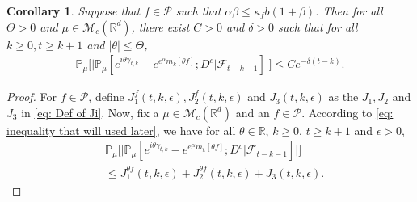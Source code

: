 \documentclass[12pt,a4paper]{amsart}
\theoremstyle{plain}
\newtheorem{cor}[thm]{Corollary}
\theoremstyle{definition}
\numberwithin{equation}{section}
\begin{document}
\begin{cor}\label{cor: used in next corollary}
Suppose that $f\in \mathcal{P}$ such that $\alpha\beta\leq \kappa_fb(1+\beta)$.
Then for all $\Theta >0$ and $\mu\in \mathcal M_c(\mathbb R^d)$,
there exist $C>0$ and $\delta>0$ such that for all $k \geq 0, t\geq k+1$ and $|\theta|\leq \Theta$,
\begin{equation}\begin{split}
    \mathbb{P}_{\mu}\Big[\big|\mathbb{P}_{\mu}[e^{i\theta\gamma_{t,k}}-e^{e^{\alpha}m_k[\theta f]}; D^c | \mathscr F_{t-k-1}]\big|\Big]\leq Ce^{-\delta(t-k)}.
\end{split}\end{equation}
\end{cor}
\begin{proof}
	For  $f\in \mathcal P$, define $J_1^f(t,k,\epsilon), J_2^f(t,k,\epsilon)$ and $J_3(t,k,\epsilon)$ as the $J_1, J_2$ and $J_3$ in \eqref{eq: Def of Ji}.
	Now, fix a $\mu \in \mathcal M_c(\mathbb R^d)$ and an $f\in \mathcal P$.
    According to \eqref{eq: inequality that will used later},  we have for all $\theta\in \mathbb R$, $k\geq 0$, $t\geq k+1$ and $\epsilon> 0$,
\begin{equation}\begin{split}
    &\mathbb{P}_{\mu}\Big[\big| \mathbb{P}_{\mu}[e^{i\theta \gamma_{t,k}}-e^{e^{\alpha}m_k[\theta f]}; D^c | \mathscr F_{t-k-1}]\big|\Big]
    \\&\leq J^{\theta f}_1(t,k,\epsilon) + J^{\theta f}_2(t,k,\epsilon)+J_3(t,k,\epsilon).
\end{split}\end{equation}


\end{proof}
\end{document}
